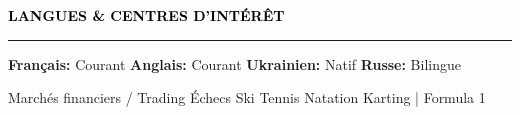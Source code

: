 \documentclass[10pt,english,french]{article}
\newcommand{\chessIcon}[1][black]{\textcolor{#1}{\faChess}}
\newcommand{\skiIcon}[1][black]{\textcolor{#1}{\faSkiing}}
\newcommand{\cryptoIcon}[1][black]{\textcolor{#1}{\faBitcoin}}
\newcommand{\swimmingIcon}[1][black]{\textcolor{#1}{\faSwimmer}}
\newcommand{\mountainsIcon}[1][black]{\textcolor{#1}{\faMountain}}
\newcommand{\speechBubbleIcon}[1][black]{\textcolor{#1}{\faComment}}
\newcommand{\tradingIcon}[1][black]{\textcolor{#1}{\faChartBar}}
\newcommand{\tennisIcon}[1][black]{\textcolor{#1}{\faBaseballBall}}
\newcommand{\flagIcon}[1][black]{\textcolor{#1}{\faFlagCheckered}}
\newlength{\mpwidth}
\newcommand{\cvsection}[1]{
    \vspace{4pt}
    \textbf{\fontsize{9pt}{10pt}\selectfont \textcolor{black}{#1}}
    \vspace{6pt}
    \hrule
    \vspace{6pt}
}
\newcommand{\cvtextnotab}[1]{
    \parbox{1\mpwidth}{#1}
}
\begin{document}
\vspace{-5pt}
\cvsection{\speechBubbleIcon[black]\hspace{4pt}LANGUES \& CENTRES D'INTÉRÊT}

\vspace{-3pt}
\cvtextnotab{\textbf{Français\!:} Courant \hspace{12pt} \textbf{Anglais\!:} Courant \hspace{12pt} \textbf{Ukrainien\!:} Natif \hspace{20pt} \textbf{Russe\!:} Bilingue}

\vspace{-8pt}
\cvtextnotab{
    \tradingIcon[black]\hspace{2pt}Marchés financiers / Trading \hspace{12pt}
    \chessIcon[black]\hspace{2pt}Échecs \hspace{12pt}
    \skiIcon[black]\hspace{2pt}Ski \hspace{12pt}
    \tennisIcon[black]\hspace{2pt}Tennis \hspace{12pt}
    \swimmingIcon[black]\hspace{2pt}Natation \hspace{12pt}
    \flagIcon[black]\hspace{2pt}Karting | Formula 1
}
\end{document}
